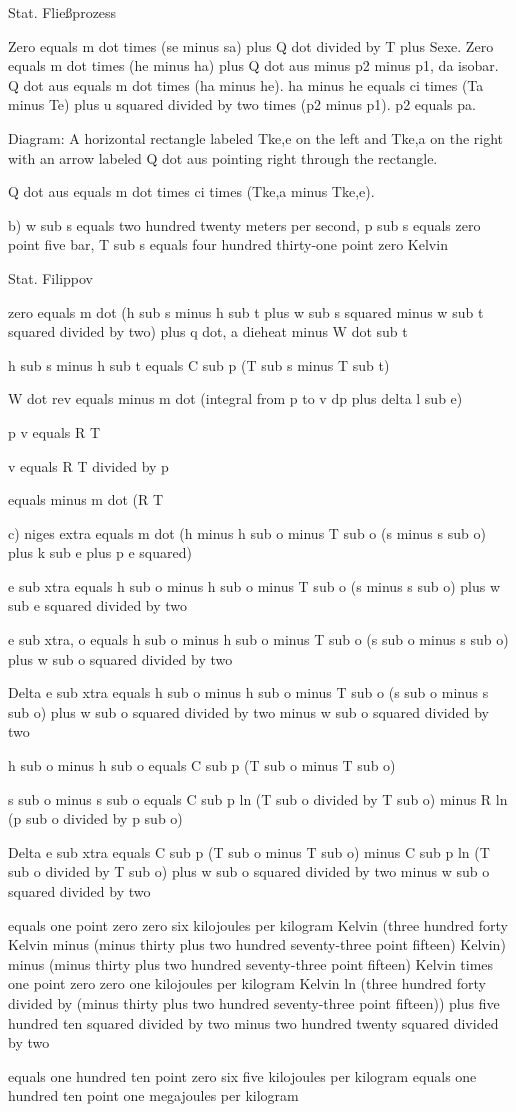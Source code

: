 Stat. Fließprozess

Zero equals m dot times (se minus sa) plus Q dot divided by T plus Sexe.  
Zero equals m dot times (he minus ha) plus Q dot aus minus p2 minus p1, da isobar.  
Q dot aus equals m dot times (ha minus he).  
ha minus he equals ci times (Ta minus Te) plus u squared divided by two times (p2 minus p1).  
p2 equals pa.

Diagram: A horizontal rectangle labeled Tke,e on the left and Tke,a on the right with an arrow labeled Q dot aus pointing right through the rectangle.

Q dot aus equals m dot times ci times (Tke,a minus Tke,e).

b) w sub s equals two hundred twenty meters per second, p sub s equals zero point five bar, T sub s equals four hundred thirty-one point zero Kelvin

Stat. Filippov

zero equals m dot (h sub s minus h sub t plus w sub s squared minus w sub t squared divided by two) plus q dot, a dieheat minus W dot sub t

h sub s minus h sub t equals C sub p (T sub s minus T sub t)

W dot rev equals minus m dot (integral from p to v dp plus delta l sub e)

p v equals R T

v equals R T divided by p

equals minus m dot (R T

c) niges extra equals m dot (h minus h sub o minus T sub o (s minus s sub o) plus k sub e plus p e squared)

e sub xtra equals h sub o minus h sub o minus T sub o (s minus s sub o) plus w sub e squared divided by two

e sub xtra, o equals h sub o minus h sub o minus T sub o (s sub o minus s sub o) plus w sub o squared divided by two

Delta e sub xtra equals h sub o minus h sub o minus T sub o (s sub o minus s sub o) plus w sub o squared divided by two minus w sub o squared divided by two

h sub o minus h sub o equals C sub p (T sub o minus T sub o)

s sub o minus s sub o equals C sub p ln (T sub o divided by T sub o) minus R ln (p sub o divided by p sub o)

Delta e sub xtra equals C sub p (T sub o minus T sub o) minus C sub p ln (T sub o divided by T sub o) plus w sub o squared divided by two minus w sub o squared divided by two

equals one point zero zero six kilojoules per kilogram Kelvin (three hundred forty Kelvin minus (minus thirty plus two hundred seventy-three point fifteen) Kelvin) minus (minus thirty plus two hundred seventy-three point fifteen) Kelvin times one point zero zero one kilojoules per kilogram Kelvin ln (three hundred forty divided by (minus thirty plus two hundred seventy-three point fifteen)) plus five hundred ten squared divided by two minus two hundred twenty squared divided by two

equals one hundred ten point zero six five kilojoules per kilogram equals one hundred ten point one megajoules per kilogram